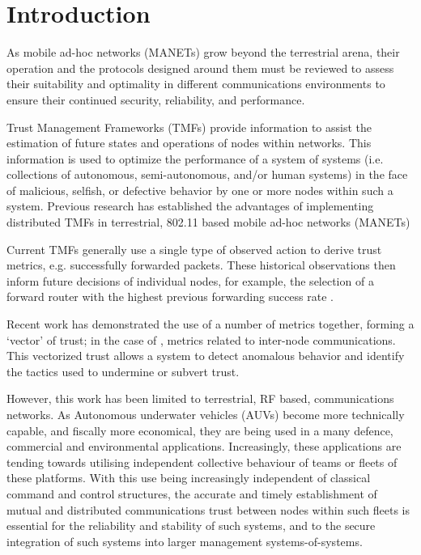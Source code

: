 \documentclass[runningheads,a4paper]{llncs}
\begin{document}
\section{Introduction}\label{sec:introduction}

As mobile ad-hoc networks (MANETs) grow beyond the terrestrial arena, their operation and the protocols designed around them must be reviewed to assess their suitability and optimality in different communications environments to ensure their continued security, reliability, and performance.

Trust Management Frameworks (TMFs) provide information to assist the estimation of future states and operations of nodes within networks. 
This information is used to optimize the performance of a system of systems (i.e. collections of autonomous, semi-autonomous, and/or human systems) in the face of malicious, selfish, or defective behavior by one or more nodes within such a system. 
Previous research has established the advantages of implementing distributed TMFs in terrestrial, 802.11 based mobile ad-hoc networks (MANETs) \cite{Li2007}

Current TMFs generally use a single type of observed action to derive trust metrics, e.g. successfully forwarded packets. These historical observations then inform future decisions of individual nodes, for example, the selection of a forward router with the highest previous forwarding success rate \cite{Li2008}.

Recent work has demonstrated the use of a number of metrics together, forming a ‘vector’ of trust; in the case of \cite{Guo2012}, metrics related to inter-node communications. This vectorized trust allows a system to detect anomalous behavior and identify the tactics used to undermine or subvert trust.

However, this work has been limited to terrestrial, RF based, communications networks.
As Autonomous underwater vehicles (AUVs) become more technically capable, and fiscally more economical, they are being used in a many defence, commercial and environmental applications. 
Increasingly, these applications are tending towards utilising  independent collective behaviour of teams or fleets of these platforms. 
With this use being increasingly independent of classical command and control structures, the accurate and timely establishment of mutual and distributed communications trust between nodes within such fleets is essential for the reliability and stability of such systems, and to the secure integration of such systems into larger management systems-of-systems. 
\end{document}
